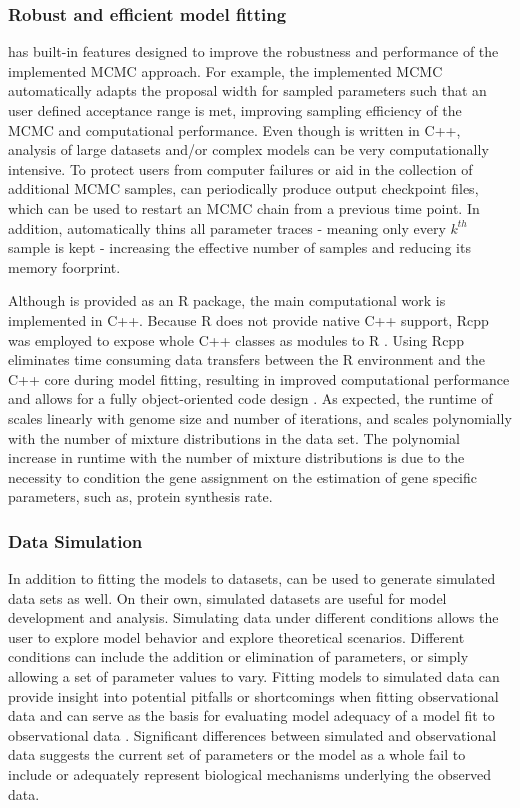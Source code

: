 \subsubsection{Robust and efficient model fitting}
\package has built-in features designed to improve the robustness and performance of the implemented MCMC approach. 
For example, the implemented MCMC automatically adapts the proposal width for sampled parameters such that an user defined acceptance range is met, improving sampling efficiency of the MCMC and computational performance.
Even though \package is written in C++, analysis of large datasets and/or complex models can be very computationally intensive.
To protect users from computer failures or aid in the collection of additional MCMC samples, \package can periodically produce output checkpoint files, which can be used to restart an MCMC chain from a previous time point.
In addition, \package automatically thins all parameter traces -  meaning only every $k^{th}$ sample is kept - increasing the effective number of samples and reducing its memory foorprint. 

Although \package is provided as an R package, the main computational work is implemented in C++.
Because R does not provide native C++ support, Rcpp was employed to expose whole C++ classes as modules to R \citep{rcpp_package}.
Using Rcpp eliminates time consuming data transfers between the R environment and the C++ core during model fitting, resulting in improved computational performance and allows for a fully object-oriented code design \citep{ood_book}. 
As expected, the runtime of \package scales linearly with genome size and number of iterations, and scales polynomially with the number of mixture distributions in the data set. 
The polynomial increase in runtime with the number of mixture distributions is due to the necessity to condition the gene assignment on the estimation of gene specific parameters, such as, protein synthesis rate.

\subsubsection{Data Simulation}
In addition to fitting the models to datasets, \package can be used to generate simulated data sets as well.
On their own, simulated datasets are useful for model development and analysis.
Simulating data under different conditions allows the user to explore model behavior and explore theoretical scenarios. 
Different conditions can include the addition or elimination of parameters, or simply allowing a set of parameter values to vary.
Fitting models to simulated data can provide insight into potential pitfalls or shortcomings when fitting observational data and can serve as the basis for evaluating model adequacy of a model fit to observational data \citep{gumi2015}.
Significant differences between simulated and observational data suggests the current set of parameters or the model as a whole fail to include or adequately represent biological mechanisms underlying the observed data.
 
